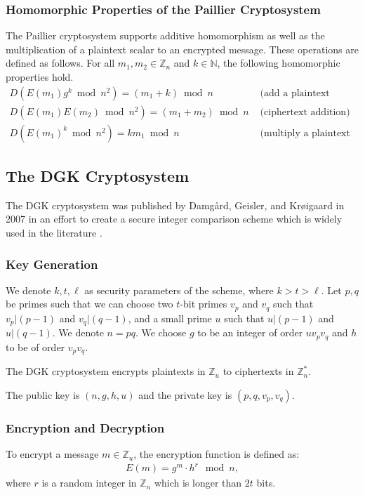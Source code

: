 \subsubsection{Homomorphic Properties of the Paillier Cryptosystem}
The Paillier cryptosystem supports additive homomorphism as well as the multiplication of a plaintext scalar to an encrypted message. These operations are defined as follows.
For all $m_1,m_2 \in \mathbb{Z}_n$ and $k\in \mathbb{N}$, the following homomorphic properties hold.
\begin{align*}
  D(E(m_1)g^k\bmod n^2)=(m_1+k)\bmod n & \text{ (add a plaintext constant)}\\
  D(E(m_1)E(m_2)\bmod n^2)=(m_1+m_2)\bmod n & \text{ (ciphertext addition)}\\
  D(E(m_1)^k\bmod n^2)= km_1\bmod n & \text{ (multiply a plaintext constant)}
\end{align*}

\subsection{The DGK Cryptosystem}
The DGK cryptosystem was published by Damg{\aa}rd, Geisler, and Kr{\o}igaard in 2007 in an effort to create a secure integer comparison scheme \cite{pieprzyk_efficient_2007, cryptoeprint:2008:321} which is widely used in the literature \cite{veugen_improving_2012}.

\subsubsection{Key Generation}
We denote $k,t,\ell$ as security parameters of the scheme, where $k>t>\ell$.
Let $p,q$ be primes such that
we can choose two $t$-bit primes $v_p$ and $v_q$ such that $v_p | (p-1)$ and $v_q | (q-1)$, and a small prime $u$ such that $u | (p-1)$ and $u | (q-1)$.
We denote $n = pq$.
We choose $g$ to be an integer of order $uv_pv_q$ and $h$ to be of order $v_pv_q$.

The DGK cryptosystem encrypts plaintexts in $\mathbb{Z}_u$ to ciphertexts in $\mathbb{Z}_n^\ast$.

The public key is $(n,g,h,u)$ and the private key is $(p,q,v_p,v_q)$.

\subsubsection{Encryption and Decryption}
To encrypt a message $m \in \mathbb{Z}_u$, the encryption function is defined as:
\begin{align*}
  E(m) = g^m \cdot h^r \mod{n},
\end{align*}
where $r$ is a random integer in $\mathbb{Z}_n$ which is longer than $2t$ bits.

